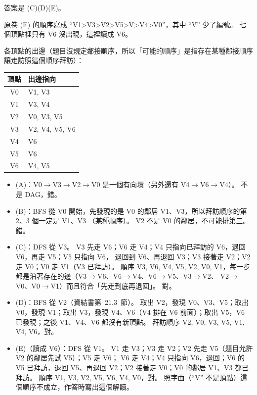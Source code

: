 \begin{pastsoln}
答案是 (C)(D)(E)。

原卷 (E) 的順序寫成 ``V1>V3>V2>V5>V>V4>V0''，其中 ``V'' 少了編號。 七個頂點裡只有 V6 沒出現，這裡讀成
V6。

各頂點的出邊（題目沒規定鄰接順序，所以「可能的順序」是指存在某種鄰接順序讓走訪照這個順序拜訪）：
\begin{center}
\small
\begin{tabular}{cl}
\toprule
頂點 & 出邊指向 \\
\midrule
V0 & V1, V3 \\
V1 & V3, V4 \\
V2 & V0, V3, V5 \\
V3 & V2, V4, V5, V6 \\
V4 & V6 \\
V5 & V6 \\
V6 & V4, V5 \\
\bottomrule
\end{tabular}
\end{center}
\begin{itemize}
\item (A)：V0$\to$V3$\to$V2$\to$V0 是一個有向環（另外還有 V4$\to$V6$\to$V4）。 不是 DAG，錯。
\item (B)：BFS 從 V0 開始，先發現的是 V0 的鄰居 V1、V3，所以拜訪順序的第 2、3 個一定是 V1、V3
（某種順序）。 V2 不是 V0 的鄰居，不可能排第三。 錯。
\item (C)：DFS 從 V3。 V3 先走 V6；V6 走 V4；V4 只指向已拜訪的 V6，退回 V6，再走 V5；V5 只指向 V6，
退回到 V6、再退回 V3；V3 接著走 V2；V2 走 V0；V0 走 V1（V3 已拜訪）。 順序
V3, V6, V4, V5, V2, V0, V1，每一步都是沿著存在的邊（V3$\to$V6、V6$\to$V4、V6$\to$V5、V3$\to$V2、
V2$\to$V0、V0$\to$V1）而且符合「先走到底再退回」。 對。
\item (D)：BFS 從 V2（資結書第~21.3~節）。 取出 V2，發現 V0、V3、V5；取出 V0，發現 V1；取出 V3，發現
V4、V6（V4 排在 V6 前面）；取出 V5，V6 已發現；之後 V1、V4、V6 都沒有新頂點。 拜訪順序
V2, V0, V3, V5, V1, V4, V6，對。
\item (E)（讀成 V6）：DFS 從 V1。 V1 走 V3；V3 走 V2；V2 先走 V5（題目允許 V2 的鄰居先試 V5）；V5 走 V6；
V6 走 V4；V4 只指向 V6，退回；V6 的 V5 已拜訪，退回 V5、再退回 V2；V2 接著走 V0；V0 的鄰居 V1、V3 都已拜訪。
順序 V1, V3, V2, V5, V6, V4, V0，對。 照字面（``V'' 不是頂點）這個順序不成立，作答時寫出這個解讀。
\end{itemize}
\end{pastsoln}
